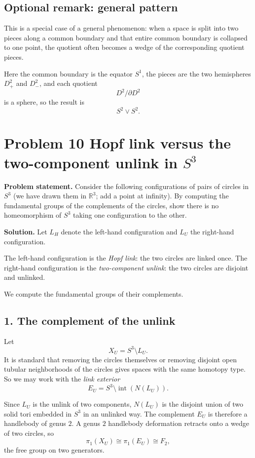 \documentclass[12pt,a4paper]{article}
\theoremstyle{notespace}
\begin{document}
\subsection{Optional remark: general pattern}

This is a special case of a general phenomenon: when a space is split into two pieces along a common boundary and that entire common boundary is collapsed to one point, the quotient often becomes a wedge of the corresponding quotient pieces.

Here the common boundary is the equator \(S^1\), the pieces are the two hemispheres \(D^2_+\) and \(D^2_-\), and each quotient
\[
D^2/\partial D^2
\]
is a sphere, so the result is
\[
S^2\vee S^2.
\]

\section{Problem 10 Hopf link versus the two-component unlink in \(S^3\)}

\textbf{Problem statement.}
Consider the following configurations of pairs of circles in \(S^3\) (we have drawn them in \(\mathbb{R}^3\); add a point at infinity). By computing the fundamental groups of the complements of the circles, show there is no homeomorphism of \(S^3\) taking one configuration to the other.

\medskip

\textbf{Solution.}
Let \(L_H\) denote the left-hand configuration and \(L_U\) the right-hand configuration.

The left-hand configuration is the \emph{Hopf link}: the two circles are linked once.
The right-hand configuration is the \emph{two-component unlink}: the two circles are disjoint and unlinked.

We compute the fundamental groups of their complements.

\subsection*{1. The complement of the unlink}
Let
\[
X_U = S^3 \setminus L_U.
\]
It is standard that removing the circles themselves or removing disjoint open tubular neighborhoods of the circles gives spaces with the same homotopy type. So we may work with the \emph{link exterior}
\[
E_U = S^3 \setminus \operatorname{int}(N(L_U)).
\]

Since \(L_U\) is the unlink of two components, \(N(L_U)\) is the disjoint union of two solid tori embedded in \(S^3\) in an unlinked way. The complement \(E_U\) is therefore a handlebody of genus \(2\). A genus \(2\) handlebody deformation retracts onto a wedge of two circles, so
\[
\pi_1(X_U)\cong \pi_1(E_U)\cong F_2,
\]
the free group on two generators.
\end{document}
